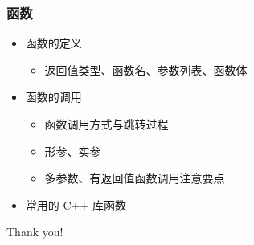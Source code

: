 \begin{frame}[fragile]
    \frametitle{函数}

    \begin{itemize}
        \item<1-> 函数的定义
        
            \begin{itemize}
                \item 返回值类型、函数名、参数列表、函数体
            \end{itemize}

        \item<2-> 函数的调用
        
            \begin{itemize}
                \item 函数调用方式与跳转过程
                \item 形参、实参
                \item 多参数、有返回值函数调用注意要点
            \end{itemize}

        \item<3-> 常用的 C++ 库函数
    \end{itemize}
\end{frame}

\begin{frame}
    \begin{center}
        {\Huge Thank you!}
    \end{center}
\end{frame}


